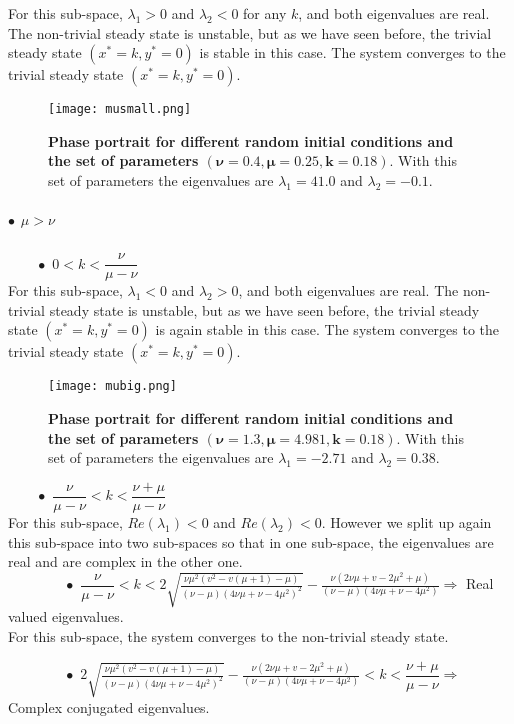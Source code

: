 \documentclass{article}
\begin{document}
For this sub-space, $\lambda_1>0$ and $\lambda_2<0$ for any $k$, and both eigenvalues are real. The non-trivial steady state is unstable, but as we have seen before, the trivial steady state $(x^*=k,y^*=0)$ is stable in this case.  The system converges to the trivial steady state $(x^*=k,y^*=0)$.
\begin{figure}[H]
	  \centering
  	\texttt{[image: musmall.png]}\caption{\textbf{Phase portrait for different random initial conditions and the set of parameters $\pmb{(\nu=0.4,\mu=0.25,k=0.18)}$}. With this set of parameters the eigenvalues are $\lambda_1=41.0$ and $\lambda_2=-0.1$.}
	\end{figure}
\subparagraph{$\bullet$ $\mu>\nu$\\}

$\qquad \bullet$ $0<k<\dfrac{\nu}{\mu-\nu}$\\

For this sub-space, $\lambda_1<0$ and $\lambda_2>0$, and both eigenvalues are real. The non-trivial steady state is unstable, but as we have seen before, the trivial steady state $(x^*=k,y^*=0)$ is again stable in this case. The system converges to the trivial steady state $(x^*=k,y^*=0)$.
\begin{figure}[H]
	  \centering
  	\texttt{[image: mubig.png]}
  	\caption{\textbf{Phase portrait for different random initial conditions and the set of parameters $\pmb{(\nu=1.3,\mu=4.981,k=0.18)}$}. With this set of parameters the eigenvalues are $\lambda_1=-2.71$ and $\lambda_2=0.38$.}
	\end{figure}
$\qquad \bullet$ $\dfrac{\nu}{\mu-\nu}<k<\dfrac{\nu+\mu}{\mu-\nu}$\\

For this sub-space, $Re(\lambda_1)<0$ and $Re(\lambda_2)<0$. However we split up again this sub-space into two sub-spaces so that in one sub-space, the eigenvalues are real and are complex in the other one. \\

$\qquad \qquad \bullet$ $\dfrac{\nu}{\mu-\nu}<k<2 \sqrt{\frac{\nu \mu ^2 \left(v^2-v (\mu +1)-\mu \right)}{(\nu-\mu )
   \left(4 \nu \mu +\nu-4 \mu ^2\right)^2}}-\frac{\nu \left(2 \nu \mu +v-2
   \mu ^2+\mu \right)}{(\nu-\mu ) \left(4 \nu \mu +\nu-4 \mu ^2\right)} \Rightarrow $ Real valued eigenvalues. \\

For this sub-space, the system converges to the non-trivial steady state.

$\qquad \qquad \bullet$ $2 \sqrt{\frac{\nu \mu ^2 \left(v^2-v (\mu +1)-\mu \right)}{(\nu-\mu )
   \left(4 \nu \mu +\nu-4 \mu ^2\right)^2}}-\frac{\nu \left(2 \nu \mu +v-2
   \mu ^2+\mu \right)}{(\nu-\mu ) \left(4 \nu \mu +\nu-4 \mu ^2\right)}<k<\dfrac{\nu+\mu}{\mu-\nu} \Rightarrow $ Complex conjugated eigenvalues.  \\
   
\end{document}
